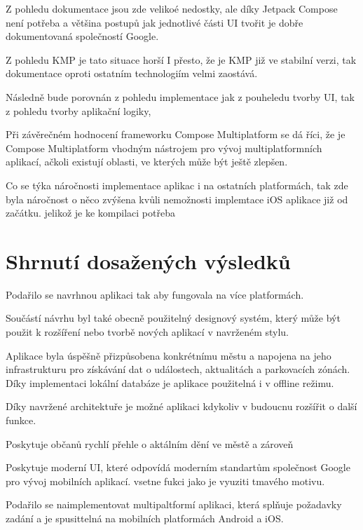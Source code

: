Z pohledu dokumentace jsou zde velikoé nedostky, ale díky Jetpack Compose není potřeba a většina postupů jak jednotlivé části 
UI tvořit je dobře dokumentovaná společností Google. 

Z pohledu KMP je tato situace horší
I přesto, že je KMP již ve stabilní verzi, tak dokumentace oproti ostatním technologiím velmi zaostává.



Následně bude porovnán z pohledu implementace  jak z pouheledu tvorby UI, tak z pohledu tvorby aplikační logiky,



Při závěrečném hodnocení frameworku Compose Multiplatform se dá říci, že 
je Compose Multiplatform vhodným nástrojem pro vývoj multiplatformních aplikací, ačkoli existují oblasti, 
ve kterých může být ještě zlepšen.


Co se týka náročnosti implementace aplikac i na ostatních platformách, tak zde byla náročnost
o něco zvýšena kvůli nemožnosti implemtace iOS aplikace již od začátku. jelikož je ke kompilaci potřeba 




\section{Shrnutí dosažených výsledků}
Podařilo se navrhnou aplikaci tak aby fungovala na více platformách.  

Součástí návrhu byl také obecně použitelný designový systém, který může být použit k rozšíření nebo tvorbě nových aplikací v navrženém stylu.

Aplikace byla úspěšně přizpůsobena konkrétnímu městu a napojena na jeho infrastrukturu pro získávání dat o událostech, 
aktualitách a parkovacích zónách. Díky implementaci lokální databáze je aplikace použitelná i v offline režimu.

Díky navržené architektuře je možné aplikaci kdykoliv v budoucnu rozšířit o další funkce. 

Poskytuje občanů rychlí přehle o aktálním dění ve městě a zároveň 

Poskytuje moderní UI, které odpovídá moderním standartům společnost Google pro vývoj mobilních aplikací.
vsetne fukci jako je vyuziti tmavého motivu.

Podařilo se naimplementovat multipaltformí aplikaci, která splňuje požadavky zadání a je spusittelná na mobilních 
platformách Android a iOS. 

